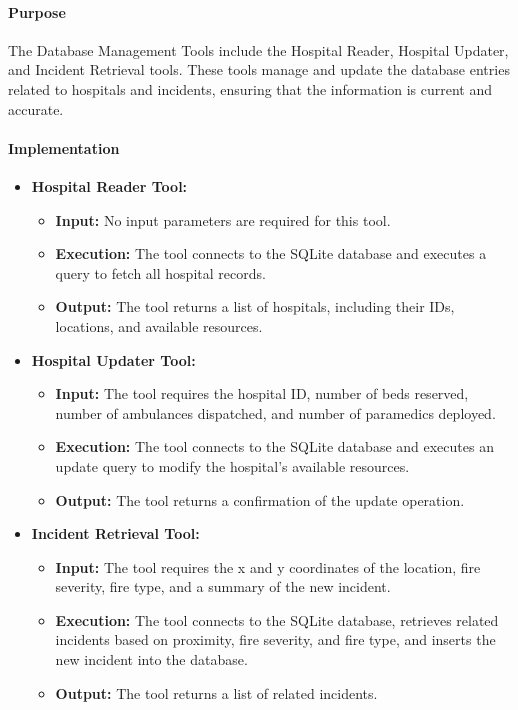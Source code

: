 \paragraph{Purpose}
The Database Management Tools include the Hospital Reader, Hospital Updater, and Incident Retrieval tools. These tools manage and update the database entries related to hospitals and incidents, ensuring that the information is current and accurate.

\paragraph{Implementation}
\begin{itemize}
    \item \textbf{Hospital Reader Tool:}
        \begin{itemize}
            \item \textbf{Input:} No input parameters are required for this tool.
            \item \textbf{Execution:} The tool connects to the SQLite database and executes a query to fetch all hospital records.
            \item \textbf{Output:} The tool returns a list of hospitals, including their IDs, locations, and available resources.
        \end{itemize}
    \item \textbf{Hospital Updater Tool:}
        \begin{itemize}
            \item \textbf{Input:} The tool requires the hospital ID, number of beds reserved, number of ambulances dispatched, and number of paramedics deployed.
            \item \textbf{Execution:} The tool connects to the SQLite database and executes an update query to modify the hospital's available resources.
            \item \textbf{Output:} The tool returns a confirmation of the update operation.
        \end{itemize}
    \item \textbf{Incident Retrieval Tool:}
        \begin{itemize}
            \item \textbf{Input:} The tool requires the x and y coordinates of the location, fire severity, fire type, and a summary of the new incident.
            \item \textbf{Execution:} The tool connects to the SQLite database, retrieves related incidents based on proximity, fire severity, and fire type, and inserts the new incident into the database.
            \item \textbf{Output:} The tool returns a list of related incidents.
        \end{itemize}
\end{itemize}

